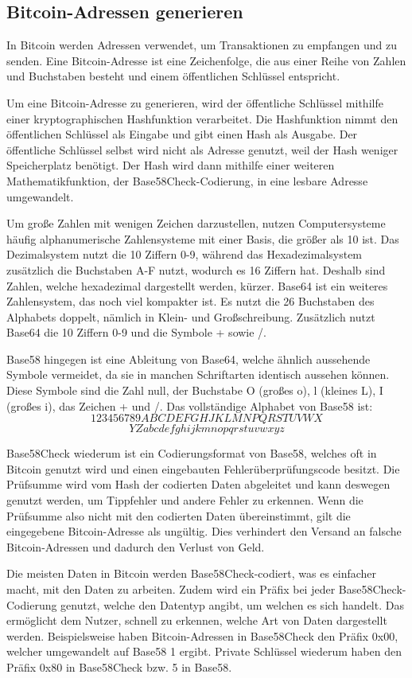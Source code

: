 \subsection{Bitcoin-Adressen generieren}
In Bitcoin werden Adressen verwendet, um Transaktionen zu empfangen und zu senden. Eine Bitcoin-Adresse ist eine Zeichenfolge, 
die aus einer Reihe von Zahlen und Buchstaben besteht und einem öffentlichen Schlüssel entspricht.

Um eine Bitcoin-Adresse zu generieren, wird der öffentliche Schlüssel mithilfe einer kryptographischen Hashfunktion verarbeitet.
Die Hashfunktion nimmt den öffentlichen Schlüssel als Eingabe und gibt einen Hash als Ausgabe. Der öffentliche Schlüssel selbst
wird nicht als Adresse genutzt, weil der Hash weniger Speicherplatz benötigt. Der Hash wird dann mithilfe einer weiteren 
Mathematikfunktion, der Base58Check-Codierung, in eine lesbare Adresse umgewandelt.

Um große Zahlen mit wenigen Zeichen darzustellen, nutzen Computersysteme häufig alphanumerische Zahlensysteme mit einer Basis,
die größer als 10 ist. Das Dezimalsystem nutzt die 10 Ziffern 0-9, während das Hexadezimalsystem zusätzlich die Buchstaben A-F
nutzt, wodurch es 16 Ziffern hat. Deshalb sind Zahlen, welche hexadezimal dargestellt werden, kürzer. Base64 ist ein weiteres
Zahlensystem, das noch viel kompakter ist. Es nutzt die 26 Buchstaben des Alphabets doppelt, nämlich in Klein- und Großschreibung.
Zusätzlich nutzt Base64 die 10 Ziffern 0-9 und die Symbole + sowie /.

Base58 hingegen ist eine Ableitung von Base64, welche ähnlich aussehende Symbole vermeidet, da sie in manchen Schriftarten
identisch aussehen können. Diese Symbole sind die Zahl null, der Buchstabe O (großes o), l (kleines L), I (großes i), das 
Zeichen + und /. Das vollständige Alphabet von Base58 ist:
\[ 123456789ABCDEFGHJKLMNPQRSTUVWX \]
\[ YZabcdefghijkmnopqrstuvwxyz \]

Base58Check wiederum ist ein Codierungsformat von Base58, welches oft in Bitcoin genutzt wird und einen eingebauten
Fehlerüberprüfungscode besitzt. Die Prüfsumme wird vom Hash der codierten Daten abgeleitet und kann deswegen genutzt werden, 
um Tippfehler und andere Fehler zu erkennen. Wenn die Prüfsumme also nicht mit den codierten Daten übereinstimmt, gilt die
eingegebene Bitcoin-Adresse als ungültig. Dies verhindert den Versand an falsche Bitcoin-Adressen und dadurch den Verlust
von Geld. 

Die meisten Daten in Bitcoin werden Base58Check-codiert, was es einfacher macht, mit den Daten zu arbeiten. Zudem wird ein Präfix
bei jeder Base58Check-Codierung genutzt, welche den Datentyp angibt, um welchen es sich handelt. Das ermöglicht dem Nutzer, schnell
zu erkennen, welche Art von Daten dargestellt werden. Beispielsweise haben Bitcoin-Adressen in Base58Check den Präfix 0x00, welcher
umgewandelt auf Base58 1 ergibt. Private Schlüssel wiederum haben den Präfix 0x80 in Base58Check bzw. 5 in Base58.

